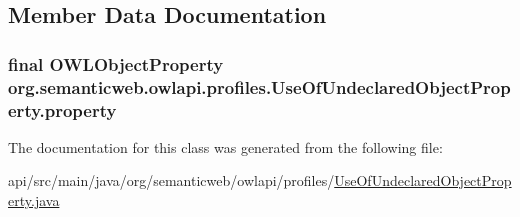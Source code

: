 \subsection{Member Data Documentation}
\hypertarget{classorg_1_1semanticweb_1_1owlapi_1_1profiles_1_1_use_of_undeclared_object_property_af97a572e1a2a0da44774510bd3d98e7f}{
\subsubsection[{property}]{\setlength{\rightskip}{0pt plus 5cm}final {\bf O\-W\-L\-Object\-Property} org.\-semanticweb.\-owlapi.\-profiles.\-Use\-Of\-Undeclared\-Object\-Property.\-property\hspace{0.3cm}{\ttfamily [private]}}}\label{classorg_1_1semanticweb_1_1owlapi_1_1profiles_1_1_use_of_undeclared_object_property_af97a572e1a2a0da44774510bd3d98e7f}


The documentation for this class was generated from the following file\-:\begin{DoxyCompactItemize}
\item 
api/src/main/java/org/semanticweb/owlapi/profiles/\hyperlink{_use_of_undeclared_object_property_8java}{Use\-Of\-Undeclared\-Object\-Property.\-java}\end{DoxyCompactItemize}
